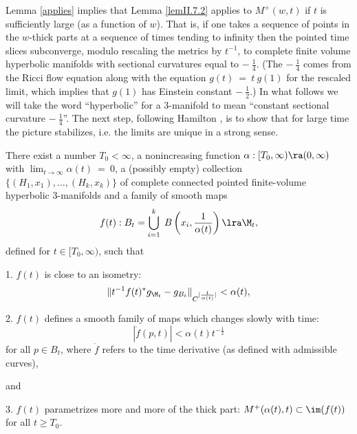 Lemma \ref{applies} implies that Lemma \ref{lemII.7.2} applies to
$M^+(w,t)$ if $t$ is sufficiently large (as a function of $w$).
That is, if one takes a sequence of points
in the $w$-thick parts at a sequence of times tending
to infinity then the pointed time slices subconverge,
modulo rescaling the metrics by $t^{-1}$, to complete finite volume
hyperbolic manifolds with sectional curvatures equal to
$- \: \frac14$. (The $- \: \frac14$ comes from the Ricci flow
equation along with the equation $g(t) \: = \: t \: g(1)$ for the rescaled
limit, which implies that $g(1)$ has Einstein constant $- \: \frac12$.)
In what follows we will take the word ``hyperbolic'' for a $3$-manifold
to mean ``constant sectional curvature $- \: \frac14$''.
The next step, following Hamilton \cite{Hamiltonn},
is to show that
for large time the picture stabilizes, i.e. the limits
are unique in a strong sense.
\begin{proposition}
  \label{prop:kl-hyperbolic-rigidity-stabilization-thick-part-monotonicity-thick-thin-geometry}

\label{slowisotopy}
There exist a number $T_0<\infty$, a nonincreasing function
$\alpha:[T_0,\infty)\ra (0,\infty)$ with
$\lim_{t \rightarrow \infty} \alpha(t) \: = \: 0$,
a (possibly empty) collection
$\{(H_1,x_1),\ldots,(H_k,x_k)\}$
of complete connected pointed finite-volume hyperbolic $3$-manifolds
and a family of smooth maps
\begin{equation}
f(t):B_t= \bigcup_{i=1}^k \;B \left( x_i, \frac{1}{\alpha(t)} \right)\lra \M_t,
\end{equation}
 defined for $t\in [T_0,\infty)$, such that

1.  $f(t)$ is close to an isometry:
\begin{equation}
\|t^{-1}f(t)^*g_{\M_t}-g_{B_t}\|_{C^{[\frac{1}{\alpha(t)}]}}<\alpha(t),
\end{equation}

2. $f(t)$ defines a smooth family of maps which changes slowly
with time:
\begin{equation}
|\dot{f}(p,t)|<\alpha(t)t^{-\frac12}
\end{equation}
for all $p\in B_t$,
where $\dot{f}$ refers to the time derivative (as defined
with admissible curves),

and

3. $f(t)$ parametrizes more and more of the thick part:
 $M^+(\alpha(t),t)\subset \im(f(t))$ for all $t\geq T_0$.
\end{proposition}

